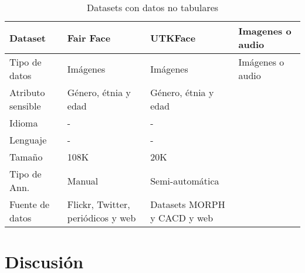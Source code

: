\begin{table}[htpb]
{\begin{tabular}{lp{}p{}p{}}
                \toprule
                \toprule
                \textbf{Dataset}   & \textbf{Fair Face}                               & \textbf{UTKFace}                                    & \textbf{Imagenes o audio}                 \\
                \toprule
                \toprule
                Tipo de datos      & Im\'agenes                                       & Im\'agenes                                          & Im\'agenes o audio                      \\
                \midrule
                Atributo sensible  & G\'enero, \'etnia y edad                         & G\'enero, \'etnia y edad \\
                \midrule
                Idioma             & -                                                & - \\
                \midrule
                Lenguaje           & -                                                & - \\
                \midrule
                Tama\~no           & 108K                                             & 20K \\
                \midrule
                Tipo de Ann.       & Manual                                           & Semi-autom\'atica\\
                \midrule
                Fuente de datos    & Flickr, Twitter, peri\'odicos y web              & Datasets MORPH y CACD y web\\
                \bottomrule
                \bottomrule
            \end{tabular}
        }
        \caption{Datasets con datos no tabulares}
        \label{table:datasets}
    \end{table}



\section{Discusi\'on}

